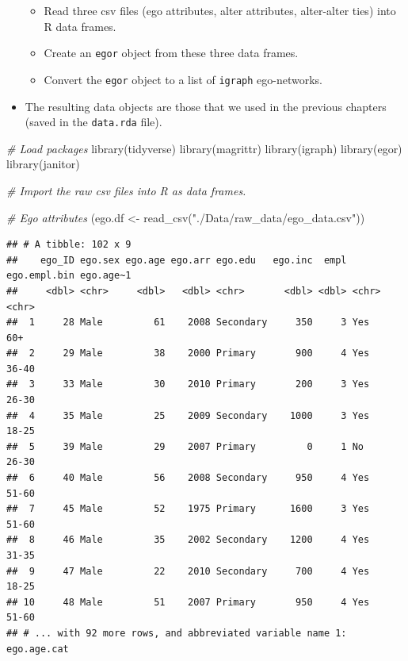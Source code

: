 \documentclass[
]{book}
\newenvironment{Shaded}{\begin{snugshade}}{\end{snugshade}}
\newcommand{\CommentTok}[1]{\textcolor[rgb]{0.56,0.35,0.01}{\textit{#1}}}
\newcommand{\FunctionTok}[1]{\textcolor[rgb]{0.00,0.00,0.00}{#1}}
\newcommand{\NormalTok}[1]{#1}
\newcommand{\OtherTok}[1]{\textcolor[rgb]{0.56,0.35,0.01}{#1}}
\newcommand{\StringTok}[1]{\textcolor[rgb]{0.31,0.60,0.02}{#1}}
\providecommand{\tightlist}{%
  \setlength{\itemsep}{0pt}\setlength{\parskip}{0pt}}
\begin{document}
\begin{itemize}
  \begin{itemize}
  \tightlist
  \item
    Read three csv files (ego attributes, alter attributes, alter-alter ties) into R data frames.
  \item
    Create an \texttt{egor} object from these three data frames.
  \item
    Convert the \texttt{egor} object to a list of \texttt{igraph} ego-networks.
  \end{itemize}
\item
  The resulting data objects are those that we used in the previous chapters (saved in the \texttt{data.rda} file).
\end{itemize}

\begin{Shaded}
\begin{Highlighting}[]
\CommentTok{\# Load packages}
\FunctionTok{library}\NormalTok{(tidyverse)}
\FunctionTok{library}\NormalTok{(magrittr)}
\FunctionTok{library}\NormalTok{(igraph)}
\FunctionTok{library}\NormalTok{(egor)}
\FunctionTok{library}\NormalTok{(janitor)}

\CommentTok{\# Import the raw csv files into R as data frames.}

\CommentTok{\# Ego attributes}
\NormalTok{(ego.df }\OtherTok{\textless{}{-}} \FunctionTok{read\_csv}\NormalTok{(}\StringTok{"./Data/raw\_data/ego\_data.csv"}\NormalTok{))}
\end{Highlighting}
\end{Shaded}

\begin{verbatim}
## # A tibble: 102 x 9
##    ego_ID ego.sex ego.age ego.arr ego.edu   ego.inc  empl ego.empl.bin ego.age~1
##     <dbl> <chr>     <dbl>   <dbl> <chr>       <dbl> <dbl> <chr>        <chr>    
##  1     28 Male         61    2008 Secondary     350     3 Yes          60+      
##  2     29 Male         38    2000 Primary       900     4 Yes          36-40    
##  3     33 Male         30    2010 Primary       200     3 Yes          26-30    
##  4     35 Male         25    2009 Secondary    1000     3 Yes          18-25    
##  5     39 Male         29    2007 Primary         0     1 No           26-30    
##  6     40 Male         56    2008 Secondary     950     4 Yes          51-60    
##  7     45 Male         52    1975 Primary      1600     3 Yes          51-60    
##  8     46 Male         35    2002 Secondary    1200     4 Yes          31-35    
##  9     47 Male         22    2010 Secondary     700     4 Yes          18-25    
## 10     48 Male         51    2007 Primary       950     4 Yes          51-60    
## # ... with 92 more rows, and abbreviated variable name 1: ego.age.cat
\end{verbatim}
\end{document}

